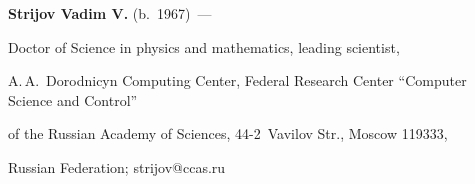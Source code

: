 \textbf{Strijov Vadim V.} (b.\ 1967)~--- 


Doctor of Science in physics and mathematics, leading scientist, 


A.\,A.~Dorodnicyn Computing Center, Federal Research Center ``Computer Science and Control'' 


of the Russian Academy of Sciences, 44-2~Vavilov Str., Moscow 119333, 


Russian Federation; \mbox{strijov@ccas.ru}


\label{end\stat}








\renewcommand{\bibname}{\protect\rm Литература} 


